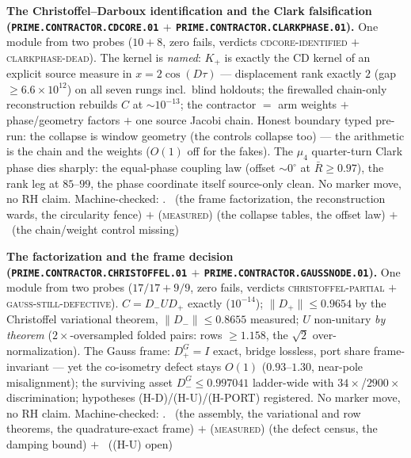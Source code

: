 \par\smallskip\noindent\textbf{The Christoffel--Darboux
identification and the Clark falsification
(\texttt{PRIME.CONTRACTOR.\allowbreak CDCORE.01} $+$
\texttt{PRIME.CONTRACTOR.\allowbreak CLARKPHASE.01}).}
One module from two probes ($10 + 8$, zero fails, verdicts
\textsc{cdcore-identified} $+$ \textsc{clarkphase-dead}).  The
kernel is \emph{named}: $K_+$ is exactly the CD kernel of an
explicit source measure in $x = 2\cos(D\tau)$ --- displacement
rank exactly $2$ (gap $\ge 6.6\times10^{12}$) on all seven rungs
incl.\ blind holdouts; the firewalled chain-only reconstruction
rebuilds $C$ at ${\sim}10^{-13}$; the contractor $=$ arm weights
$+$ phase/geometry factors $+$ one source Jacobi chain.  Honest
boundary typed pre-run: the collapse is window geometry (the
controls collapse too) --- the arithmetic is the chain and the
weights ($O(1)$ off for the fakes).  The $\mu_4$ quarter-turn
Clark phase dies sharply: the equal-phase coupling law (offset
${\sim}0^\circ$ at $\bar R \ge 0.97$), the rank leg at
$85$--$99$, the phase coordinate itself source-only clean.  No
marker move, no RH claim.
Machine-checked: .
\mE\ (the frame factorization, the reconstruction wards, the
circularity fence) $+$ (\textsc{measured}) (the collapse tables,
the offset law) $+$ \mO\ (the chain/weight control missing)
\par\smallskip


\par\smallskip\noindent\textbf{The factorization and the frame
decision (\texttt{PRIME.CONTRACTOR.\allowbreak CHRISTOFFEL.01}
$+$ \texttt{PRIME.CONTRACTOR.\allowbreak GAUSSNODE.01}).}
One module from two probes ($17/17 + 9/9$, zero fails, verdicts
\textsc{christoffel-partial} $+$
\textsc{gauss-still-defective}).  $C = D_-UD_+$ exactly
($10^{-14}$); $\|D_+\| \le 0.9654$ by the Christoffel
variational theorem, $\|D_-\| \le 0.8655$ measured; $U$
non-unitary \emph{by theorem} ($2\times$-oversampled folded
pairs: rows $\ge 1.158$, the $\sqrt2$ over-normalization).  The
Gauss frame: $D_+^G = I$ exact, bridge lossless, port share
frame-invariant --- yet the co-isometry defect stays $O(1)$
($0.93$--$1.30$, near-pole misalignment); the surviving asset
$D_-^G \le 0.997041$ ladder-wide with $34\times$/$2900\times$
discrimination; hypotheses (H-D)/(H-U)/(H-PORT) registered.  No
marker move, no RH claim.
Machine-checked: .
\mE\ (the assembly, the variational and row theorems, the
quadrature-exact frame) $+$ (\textsc{measured}) (the defect
census, the damping bound) $+$ \mO\ ((H-U) open)
\par\smallskip


